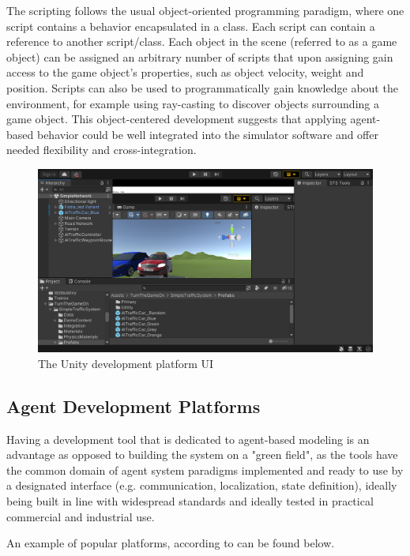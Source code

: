 \documentclass[0main.tex]{subfiles}
\begin{document}
The scripting follows the usual object-oriented programming paradigm, where one script contains a
behavior encapsulated in a class. Each script can contain a reference to another
script/class. Each object in the scene (referred to as a game object) can be assigned an arbitrary number of scripts that upon 
assigning gain access to the game object's properties, such as object velocity, weight and position. 
Scripts can also be used to programmatically gain knowledge about the environment, for example 
using ray-casting to discover objects surrounding a game object. This object-centered 
development suggests that applying agent-based behavior could be well integrated into the 
simulator software and offer needed flexibility and cross-integration.

\begin{figure}[htbp]
    \centering
    \includegraphics[width=.9\textwidth]{unityUI.png}
    \caption{The Unity development platform UI}
    \label{fig-unity}
\end{figure}

\subsection{Agent Development Platforms}

Having a development tool that is dedicated to agent-based modeling is an advantage as opposed to building the 
system on a "green field", as the tools have the common domain of agent system paradigms implemented and ready 
to use by a designated interface (e.g. communication, localization, state definition), ideally being built in line 
with widespread standards and ideally tested in practical commercial and industrial use. 

An example of popular platforms, according to \cite{Binder2022} can be found below. 
\end{document}
